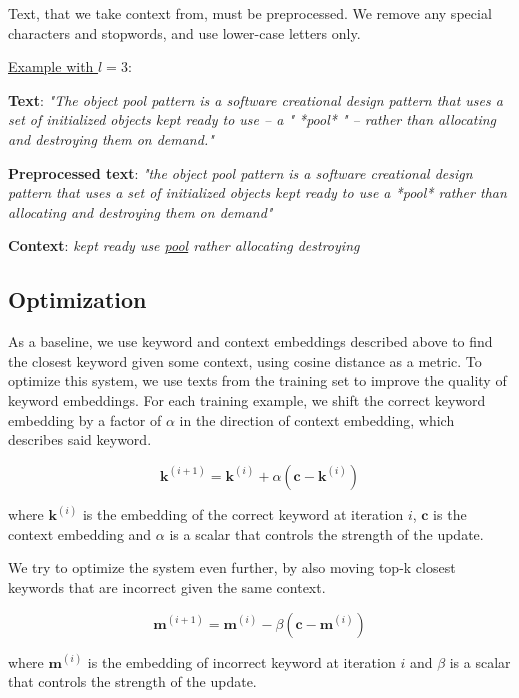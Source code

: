\documentclass{llncs}
\begin{document}
Text, that we take context from, must be preprocessed.
We remove any special characters and stopwords, and use lower-case letters only.

\underline{Example with \(l=3\)}:

\textbf{Text}:
\textit{"The object pool pattern is a software creational design pattern that uses a set of initialized objects kept ready to use – a " *pool* " – rather than allocating and destroying them on demand."}

\textbf{Preprocessed text}:
\textit{"the object pool pattern is a software creational design pattern that uses a set of initialized objects kept ready to use a *pool* rather than allocating and destroying them on demand"}

\textbf{Context}:
\textit{kept ready use \underline{pool} rather allocating destroying}

\subsection{Optimization}
As a baseline, we use keyword and context embeddings described above to find the closest keyword given some context, using cosine distance as a metric.
To optimize this system, we use texts from the training set to improve the quality of keyword embeddings.
For each training example, we shift the correct keyword embedding by a factor of \(\alpha\) in the direction of context embedding, which describes said keyword.

\begin{equation}
    \label{eq:alpha_optimization}
    \bm{k}^{(i+1)} = \bm{k}^{(i)} + \alpha(\bm{c} - \bm{k}^{(i)})
\end{equation}

where \(\bm{k}^{(i)}\) is the embedding of the correct keyword at iteration \(i\), \(\bm{c}\) is the context embedding and \(\alpha\) is a scalar that controls the strength of the update.

\smallskip
We try to optimize the system even further, by also moving top-k closest keywords that are incorrect given the same context.

\begin{equation}
    \label{eq:beta_optimization}
    \bm{m}^{(i+1)} = \bm{m}^{(i)} - \beta(\bm{c} - \bm{m}^{(i)})
\end{equation}

where \(\bm{m}^{(i)}\) is the embedding of incorrect keyword at iteration \(i\) and \(\beta\) is a scalar that controls the strength of the update.
\end{document}
